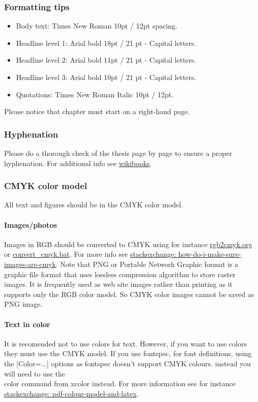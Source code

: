 \subsubsection{Formatting tips}
\begin{itemize}
    \item Body text: Times New Roman 10pt / 12pt spacing.
    \item Headline level 1: Arial bold 18pt / 21 pt - Capital letters.
    \item Headline level 2: Arial bold 11pt / 21 pt - Capital letters.
    \item Headline level 3: Arial bold 10pt / 21 pt - Capital letters.
    \item Quotations: Times New Roman Italic 10pt / 12pt.
\end{itemize}
Please notice that chapter must start on a right-hand page.

\subsubsection{Hyphenation}
Please do a thorough check of the thesis page by page to ensure a proper hyphenation. For additional info see \href{https://en.wikibooks.org/wiki/LaTeX/Text_Formatting#Hyphenation}{wikibooks}.

\subsubsection{CMYK color model}
All text and figures should be in the CMYK color model.

\paragraph{Images/photos} Images in RGB should be converted to CMYK using for instance \href{http://www.rgb2cmyk.org/}{rgb2cmyk.org} or \href{https://gist.github.com/patrickfav/21aa5bc96cd6fb9dbed1}{convert\_cmyk.bat}. For more info see \href{http://tex.stackexchange.com/questions/48101/how-do-i-make-sure-images-are-cmyk}{stackexchange: how-do-i-make-sure-images-are-cmyk}. Note that PNG or Portable Network Graphic format is a graphic file format that uses lossless compression algorithm to store raster images. It is frequently used as web site images rather than printing as it supports only the RGB color model. So CMYK color images cannot be saved as PNG image.

\paragraph{Text in color} It is recomended not to use colors for text. However, if you want to use colors they must use the CMYK model.
If you use fontspec, for font definitions, using the [Color=...] options as fontspec doesn’t support CMYK colours. instead you will need to use the \\color command from xcolor instead. For more information see for instance
\href{http://tex.stackexchange.com/questions/9961/pdf-colour-model-and-latex}{stackexchange: pdf-colour-model-and-latex}.

